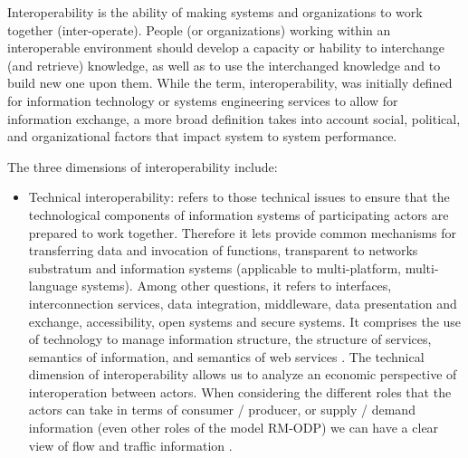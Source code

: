 \documentclass[10pt,twocolumn,ieeetran]{article}
\begin{document}
Interoperability is the ability of making systems and organizations to work together (inter-operate). People (or organizations) working within an interoperable environment should develop a capacity or hability to interchange (and retrieve) knowledge, as well as to use the interchanged knowledge and to build new one upon them. 
While the term, interoperability, was initially defined for information technology or systems engineering services to allow for information exchange, a more broad definition takes into account social, political, and organizational factors that impact system to system performance.

The three dimensions of interoperability include:

\begin{itemize}

\item Technical interoperability: refers to those technical issues to ensure that the technological components of information systems of participating actors are prepared to work together. Therefore  it lets provide common mechanisms for transferring data and invocation of functions, transparent to networks substratum and information systems (applicable to multi-platform, multi-language systems). Among other questions, it refers to interfaces, interconnection services, data integration, middleware, data presentation and exchange, accessibility, open systems and secure systems. It  comprises the use of technology to manage information structure, the structure of services, semantics of information, and semantics of web services \cite{Moreno}. The technical dimension of interoperability allows us to analyze an economic perspective of  interoperation between actors. When considering the different roles that the actors can take in terms of consumer / producer, or supply / demand information (even other roles of the model RM-ODP) we can have a clear view of flow and traffic information .


\end{itemize}
\end{document}
